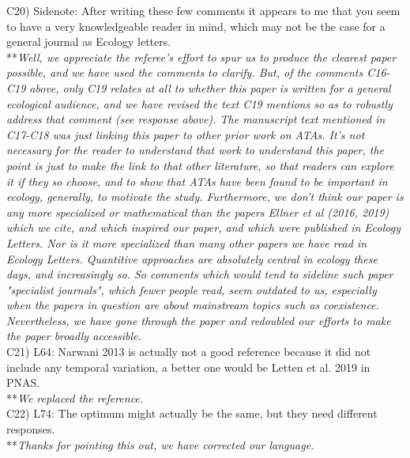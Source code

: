\documentclass[letterpaper,11pt]{article}
\begin{document}
\noindent C20) Sidenote: After writing these few comments it appears to me that you seem to have a very knowledgeable reader in mind, which may not be the case for a general journal as Ecology letters. \\

\noindent ***\emph{Well, we appreciate the referee's effort to spur us to produce the clearest 
paper possible, and we have used the comments to clarify. But, of the comments 
C16-C19 above, only C19 relates at all to whether this paper is written for a general ecological audience,
and we have revised the text C19 mentions so as to robustly address that comment (see response above). 
The manuscript text mentioned in C17-C18 was just linking this paper to other prior work on ATAs. 
It's not necessary for the reader to understand that work to understand this paper, the point is just to make 
the link to that other literature, so that readers can explore it if they so choose, 
and to show that ATAs have been found to be important in ecology, generally, to motivate the study.
Furthermore, we don't think our paper is any more specialized or mathematical than the papers Ellner et al (2016, 2019) which
we cite, and which inspired our paper, and which were published in Ecology Letters. Nor is it more 
specialized than many other papers we have read in Ecology Letters. Quantitive approaches are absolutely 
central in ecology these days, and increasingly so. So comments which would tend to sideline such paper
"specialist journals", which fewer people read, seem outdated to us, especially when the papers in question 
are about mainstream topics such
as coexistence. Nevertheless, we have gone through the paper and redoubled our efforts to make the 
paper broadly accessible.} \\

\noindent C21) L64: Narwani 2013 is actually not a good reference because it did not include any temporal variation, a better one would be Letten et al. 2019 in PNAS. \\

\noindent ***\emph{We replaced the reference.} \\

\noindent C22) L74: The optimum might actually be the same, but they need different responses. \\

\noindent ***\emph{Thanks for pointing this out, we have corrected our language.} \\
\end{document}
